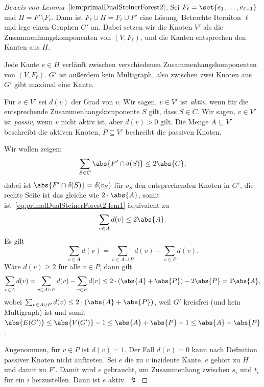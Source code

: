 \documentclass[language=ngerman,algolist]{TemplateLecture}
\begin{document}
\begin{proof}[Beweis von Lemma~$\ref{lem:primalDualSteinerForest2}$]
    Sei $F_\ell = \set{e_1, \dots, e_{\ell - 1}}$ und $H = F' \setminus F_\ell$. Dann ist $F_\ell \cup H = F_\ell \cup F'$ eine Lösung. Betrachte Iteraiton $\ell$ und lege einen Graphen $G'$ an. Dabei setzen wir die Knoten $V'$ als die Zusammenhangskomponenten von $(V, F_\ell)$, und die Kanten entsprechen den Kanten aus $H$.

    Jede Kante $e \in H$ verläuft zwischen verschiedenen Zusammenhangskomponenten von $(V, F_\ell)$. $G'$ ist außerdem kein Multigraph, also zwischen zwei Knoten aus $G'$ gibt maximal eine Kante.

    Für $v \in V'$ sei $d(v)$ der Grad von $v$. Wir sagen, $v \in V'$ ist \emph{aktiv}, wenn für die entsprechende Zusammenhangskomponente $S$ gilt, dass $S \in C$. Wir sagen, $v \in V'$ ist \emph{passiv}, wenn $v$ nicht aktiv ist, aber $d(v) > 0$ gilt. Die Menge $A \subseteq V'$ beschreibt die aktiven Knoten, $P \subseteq V'$ beshreibt die passiven Knoten.

    Wir wollen zeigen:
    \begin{equation}
        \sum_{S \in C} \abs{F' \cap \delta(S)} \leq 2 \abs{C} \label{eq:primalDualSteinerForest2-lem1},
    \end{equation}
    dabei ist $\abs{F' \cap \delta(S)} = \delta(v_S)$ für $v_S$ den entsprechenden Knoten in $G'$, die rechte Seite ist das gleiche wie $2 \cdot \abs{A}$, somit ist~\eqref{eq:primalDualSteinerForest2-lem1} äquivalent zu
    \begin{equation}
        \sum_{v \in A} d(v) \leq 2 \abs{A}.\label{eq:primalDualSteinerForest2-lem2}
    \end{equation}
    Es gilt 
    \begin{equation*}
        \sum_{v \in A} d(v) = \sum_{v \in A \cup P} d(v) - \sum_{v \in P} d(v).
    \end{equation*}
    Wäre $d(v) \geq 2$ für alle $v \in P$, dann gilt 
    \begin{equation*}
        \sum_{v \in A} d(v) = \sum_{v \in A \cup P} d(v) - \sum_{v \in P} d(v) \leq 2 \cdot (\abs{A} + \abs{P}) - 2 \abs{P} = 2 \abs{A},
    \end{equation*}
    wobei $\sum_{v \in A \cup P} d(v) \leq 2 \cdot (\abs{A} + \abs{P})$, weil $G'$ kreisfrei (und kein Multigraph) ist und somit $\abs{E(G')} \leq \abs{V(G')}-1 \leq \abs{A} + \abs{P} - 1 \leq \abs{A} + \abs{P}$.

    Angenommen, für $v \in P$ ist $d(v) = 1$. Der Fall $d(v) = 0$ kann nach Definition passiver Knoten nicht auftreten. Sei $e$ die zu $v$ inzidente Kante. $e$ gehört zu $H$ und damit zu $F'$. Damit wird $e$ gebraucht, um Zusammenhang zwischen $s_i$ und $t_i$ für ein $i$ herzustellen. Dann ist $e$ aktiv. $\lightning$ 
\end{proof}
\end{document}
